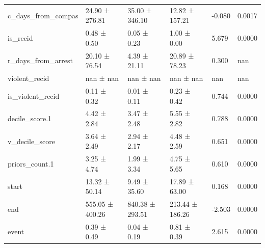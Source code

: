\begin{tabular}{llllll}
c_days_from_compas & 24.90 ± 276.81 & 35.00 ± 346.10 & 12.82 ± 157.21 & -0.080 & 0.0017 \\
is_recid & 0.48 ± 0.50 & 0.05 ± 0.23 & 1.00 ± 0.00 & 5.679 & 0.0000 \\
r_days_from_arrest & 20.10 ± 76.54 & 4.39 ± 21.11 & 20.89 ± 78.23 & 0.300 & nan \\
violent_recid & nan ± nan & nan ± nan & nan ± nan & nan & nan \\
is_violent_recid & 0.11 ± 0.32 & 0.01 ± 0.11 & 0.23 ± 0.42 & 0.744 & 0.0000 \\
decile_score.1 & 4.42 ± 2.84 & 3.47 ± 2.48 & 5.55 ± 2.82 & 0.788 & 0.0000 \\
v_decile_score & 3.64 ± 2.49 & 2.94 ± 2.17 & 4.48 ± 2.59 & 0.651 & 0.0000 \\
priors_count.1 & 3.25 ± 4.74 & 1.99 ± 3.34 & 4.75 ± 5.65 & 0.610 & 0.0000 \\
start & 13.32 ± 50.14 & 9.49 ± 35.60 & 17.89 ± 63.00 & 0.168 & 0.0000 \\
end & 555.05 ± 400.26 & 840.38 ± 293.51 & 213.44 ± 186.26 & -2.503 & 0.0000 \\
event & 0.39 ± 0.49 & 0.04 ± 0.19 & 0.81 ± 0.39 & 2.615 & 0.0000 \\
\bottomrule
\end{tabular}
